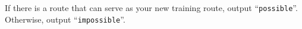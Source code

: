 
	If there is a route that can serve as your new training route, output ``\texttt{possible}''.
	Otherwise, output ``\texttt{impossible}''.
